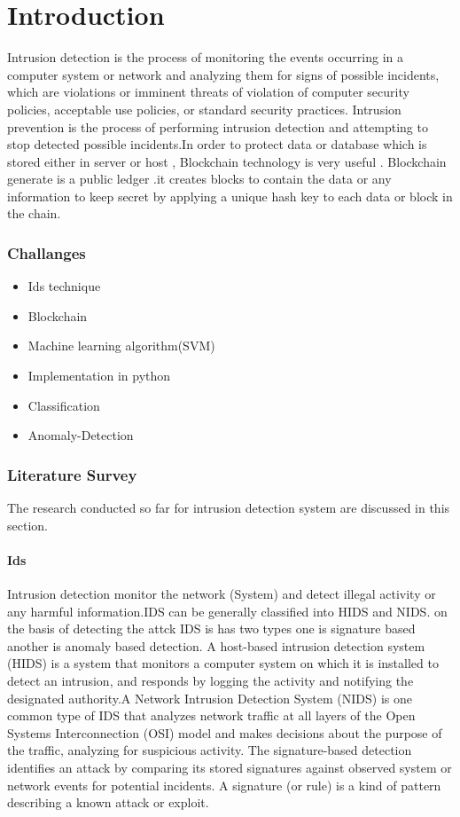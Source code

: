 ﻿\chapter{Introduction}
Intrusion detection is the process of monitoring the events occurring in a computer system or network and analyzing them for signs of possible incidents, which are violations or imminent threats of violation of computer security policies, acceptable use policies, or standard security practices. Intrusion prevention is the process of performing intrusion detection and attempting to stop detected possible incidents.In order to protect data or database which is stored either in server or host , Blockchain technology is very useful . Blockchain generate is a public ledger .it creates blocks to contain the data or any information to keep secret by applying a unique hash key to each data or block in the chain.
\subsection{Challanges}
\begin{itemize}
  \item Ids technique
  \item Blockchain
  \item Machine learning algorithm(SVM)
  \item Implementation in python
  \item Classification
  \item Anomaly-Detection
\end{itemize}
\subsection{Literature Survey}
The research conducted so far for intrusion detection system are discussed in this section.

\subsubsection{Ids}
Intrusion detection monitor the network (System) and detect illegal activity or any harmful information.IDS can be generally classified into HIDS and NIDS. on the basis of detecting the attck IDS is has two types one is signature based another is anomaly based detection.\cite{Ids}
A host-based intrusion detection system (HIDS) is a system that monitors a computer system on which it is installed to detect an intrusion, and responds by logging the activity and notifying the designated authority.A Network Intrusion Detection System (NIDS) is one common type of IDS that analyzes network traffic at all layers of the Open Systems Interconnection (OSI) model and makes decisions about the purpose of the traffic, analyzing for suspicious activity.
The signature-based detection  identifies an attack by comparing its stored signatures against observed system or network events for potential incidents. A signature (or rule) is a kind of pattern describing a known attack or exploit. 
